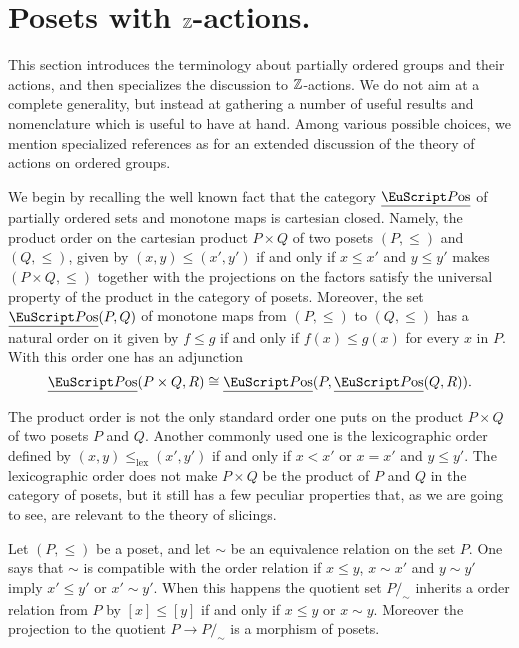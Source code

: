 \section{Posets with \texorpdfstring{$\mathbb{Z}$}{Z}-actions.}\label{posets}
\begin{modifyepigraph}{.35}
\epigraph{}{}
\end{modifyepigraph}

This section introduces the terminology about partially ordered groups and their actions, and then specializes the discussion to $\mathbb{Z}$-actions. We do not aim at a complete generality, but instead at gathering a number of useful results and nomenclature which is useful to have at hand. Among various possible choices, we mention specialized references as \cite{blyth2005lattices, glass1999partially, Fuch63} for an extended discussion of the theory of actions on ordered groups.

We begin by recalling the well known fact that the category $\Pos$ of partially ordered sets and monotone maps is cartesian closed.
Namely, the product order on the cartesian product $P\times Q$ of two posets $(P,\leq)$ and $(Q,\leq)$, given by $(x,y)\leq (x',y')$ if and only if $x\leq x'$ and $y\leq y'$ makes $(P\times Q,\leq)$ together with the projections on the factors satisfy the universal property of the product in the category of posets. Moreover, the set $\Pos(P,Q)$ of monotone maps from $(P,\leq)$ to $(Q,\leq)$ has a natural order on it given by $f\leq g$ if and only if $f(x)\leq g(x)$ for every $x$ in $P$. With this order one has 
an adjunction
\[
\Pos(P\times Q, R)\cong \Pos(P, \Pos(Q,R)).
\]
\begin{remark}
The product order is not the only standard order one puts on the product $P\times Q$ of two posets $P$ and $Q$. Another commonly used one is the lexicographic order defined by
$(x,y)\leq_{\mathrm{lex}} (x',y')$ if and only if $x< x'$ or $x=x'$ and $y\leq y'$. The lexicographic order does not make $P\times Q$ be the product of $P$ and $Q$ in the category of posets, but it still has a few peculiar properties that, as we are going to see, are relevant to the theory of slicings.
\end{remark}

\begin{remark}
\label{quotient1}
Let $(P,\leq)$ be a poset, and let $\sim$ be an equivalence relation on the set $P$. One says that $\sim$ is compatible with the order relation if $x\leq y$, $x\sim x'$ and $y\sim y'$ imply $x'\leq y'$ or $x'\sim y'$. When this happens the quotient set $P/_{\!\sim}$ inherits a order relation from $P$ by $[x]\leq [y]$ if and only if $x\leq y$ or $x\sim y$. Moreover the projection to the quotient
$P\to P/_{\!\sim}$ is a morphism of posets.
\end{remark}

